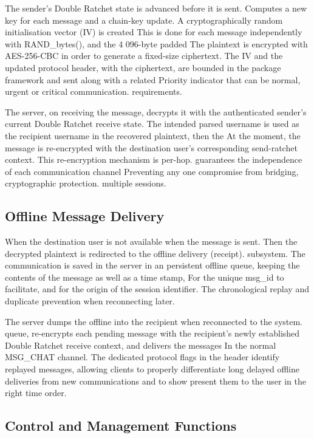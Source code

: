 \documentclass[conference]{IEEEtran}
\begin{document}
The sender's Double Ratchet state is advanced before it is sent.
Computes a new key for each message and a chain-key
update.  A cryptographically random initialisation vector (IV) is created
This is done for each message independently with RAND\_bytes(), and the 4 096-byte padded
The plaintext is encrypted with AES-256-CBC in order to generate a fixed-size ciphertext.
The IV and the updated protocol header, with the ciphertext, are
bounded in the package framework and sent along with a related
Priority indicator that can be normal, urgent or critical communication.
requirements.

The server, on receiving the message, decrypts it with the
authenticated sender's current Double Ratchet receive state.  The intended
parsed username is used as the recipient username in the recovered plaintext, then the
At the moment, the message is re-encrypted with the destination user's
corresponding send-ratchet context.  This re-encryption mechanism is per-hop.
guarantees the independence of each communication channel
Preventing any one compromise from bridging, cryptographic protection.
multiple sessions.

\subsection{Offline Message Delivery}

When the destination user is not available when the message is sent.
Then the decrypted plaintext is redirected to the offline delivery (receipt).
subsystem.  The communication is saved in the server in an persistent offline
queue, keeping the contents of the message as well as a time stamp,
For the unique msg\_id to facilitate, and for the origin of the session identifier.
The chronological replay and duplicate prevention when reconnecting later.

The server dumps the offline into the recipient when reconnected to the system.
queue, re-encrypts each pending message with the recipient's newly
established Double Ratchet receive context, and delivers the messages
In the normal MSG\_CHAT channel.  The dedicated protocol flags in the
header identify replayed messages, allowing clients to properly differentiate
long delayed offline deliveries from new communications and to show
present them to the user in the right time order.

\subsection{Control and Management Functions}
\end{document}
